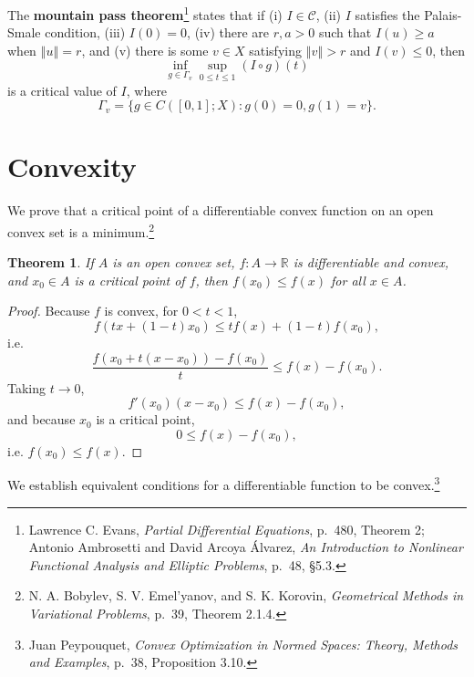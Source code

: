 \documentclass{article}
\newcommand{\norm}[1]{\left\Vert #1 \right\Vert}
\newtheorem{theorem}{Theorem}
\theoremstyle{definition}
\begin{document}
The \textbf{mountain pass theorem}\footnote{Lawrence C. Evans, {\em Partial Differential Equations},
p.~480, Theorem 2;
Antonio Ambrosetti and David Arcoya Álvarez, {\em An Introduction to Nonlinear Functional Analysis and Elliptic Problems},
p.~48, \S 5.3.}
states that if (i) $I \in \mathcal{C}$, (ii) $I$ satisfies the Palais-Smale condition, (iii) $I(0)=0$,
(iv) there are $r,a>0$ such that $I(u) \geq a$ when $\norm{u}=r$, and (v) there is some $v \in X$ satisfying
$\norm{v} > r$ and $I(v) \leq 0$, then 
\[
\inf_{g \in \Gamma_v} \sup_{0 \leq t \leq 1} (I \circ g)(t)
\]
is a critical value of $I$, where
\[
\Gamma_v=\{g \in C([0,1];X) : g(0)=0, g(1)=v\}.
\]




\section{Convexity}
We prove that a critical point of a  differentiable convex function on an open convex set is a minimum.\footnote{N. A. Bobylev, S. V. Emel'yanov, and S. K. Korovin, {\em Geometrical Methods in Variational Problems}, p.~39, Theorem 2.1.4.}

\begin{theorem}
If $A$ is an open convex set, $f:A \to \mathbb{R}$ is differentiable and convex, and $x_0 \in A$ is a critical point of $f$, then
$f(x_0) \leq f(x)$ for all $x \in A$.
\label{minimum}
\end{theorem}
\begin{proof}
Because $f$ is convex, for $0<t<1$,
\[
f(tx+(1-t)x_0) \leq tf(x)+(1-t)f(x_0),
\]
i.e.
\[
\frac{f(x_0+t(x-x_0)) - f(x_0)}{t} \leq f(x)-f(x_0).
\]
Taking $t \to 0$,
\[
f'(x_0)(x-x_0) \leq f(x)-f(x_0),
\]
and because $x_0$ is a critical point,
\[
0 \leq f(x)-f(x_0),
\]
i.e. $f(x_0) \leq f(x)$. 
\end{proof}


We establish equivalent conditions for a  differentiable function to be convex.\footnote{Juan Peypouquet,
{\em Convex Optimization in Normed Spaces: Theory, Methods and Examples}, p.~38, Proposition 3.10.}
\end{document}
